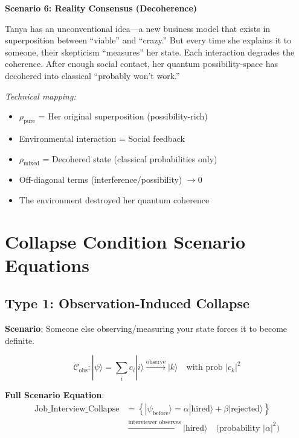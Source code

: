 \documentclass[11pt,twoside]{book}
\newcommand{\Collapse}{\mathcal{C}}
\begin{document}
\begin{tcolorbox}[colback=yellow!5!white,colframe=yellow!65!black,title=\textbf{Real-Life Scenarios: Collapse Conditions},breakable]
\textbf{Scenario 6: Reality Consensus (Decoherence)}

Tanya has an unconventional idea---a new business model that exists in superposition between ``viable'' and ``crazy.'' But every time she explains it to someone, their skepticism ``measures'' her state. Each interaction degrades the coherence. After enough social contact, her quantum possibility-space has decohered into classical ``probably won't work.''

\textit{Technical mapping:}
\begin{itemize}
    \item $\rho_{\mathrm{pure}}$ = Her original superposition (possibility-rich)
    \item Environmental interaction = Social feedback
    \item $\rho_{\mathrm{mixed}}$ = Decohered state (classical probabilities only)
    \item Off-diagonal terms (interference/possibility) $\to 0$
    \item The environment destroyed her quantum coherence
\end{itemize}

\end{tcolorbox}

\section{Collapse Condition Scenario Equations}

\subsection{Type 1: Observation-Induced Collapse}

\textbf{Scenario}: Someone else observing/measuring your state forces it to become definite.

\begin{equation}
\boxed{
    \Collapse_{\mathrm{obs}} : |\psi\rangle = \sum_i c_i |i\rangle
    \xrightarrow{\text{observe}} |k\rangle \quad \text{with prob } |c_k|^2
}
\end{equation}

\textbf{Full Scenario Equation}:
\begin{align}
    \text{Job\_Interview\_Collapse} &= \left\{
    |\psi_{\mathrm{before}}\rangle = \alpha|\text{hired}\rangle + \beta|\text{rejected}\rangle
    \right\} \\
    &\xrightarrow{\text{interviewer observes}} |\text{hired}\rangle
    \quad \text{(probability } |\alpha|^2 \text{)}
\end{align}
\end{document}
